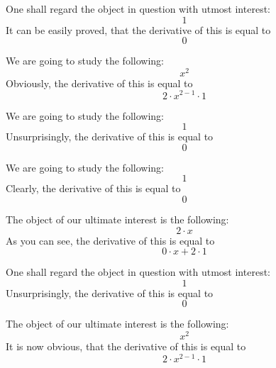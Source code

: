 \documentclass{article}
\begin{document}
One shall regard the object in question with utmost interest:
\begin{equation}
1 
\end{equation}
It can be easily proved, that the derivative of this is equal to
\begin{equation}
0 
\end{equation}

We are going to study the following:
\begin{equation}
x ^{2 } 
\end{equation}
Obviously, the derivative of this is equal to
\begin{equation}
2 \cdot x ^{2 - 1 } \cdot 1 
\end{equation}

We are going to study the following:
\begin{equation}
1 
\end{equation}
Unsurprisingly, the derivative of this is equal to
\begin{equation}
0 
\end{equation}

We are going to study the following:
\begin{equation}
1 
\end{equation}
Clearly, the derivative of this is equal to
\begin{equation}
0 
\end{equation}

The object of our ultimate interest is the following:
\begin{equation}
2 \cdot x 
\end{equation}
As you can see, the derivative of this is equal to
\begin{equation}
0 \cdot x + 2 \cdot 1 
\end{equation}

One shall regard the object in question with utmost interest:
\begin{equation}
1 
\end{equation}
Unsurprisingly, the derivative of this is equal to
\begin{equation}
0 
\end{equation}

The object of our ultimate interest is the following:
\begin{equation}
x ^{2 } 
\end{equation}
It is now obvious, that the derivative of this is equal to
\begin{equation}
2 \cdot x ^{2 - 1 } \cdot 1 
\end{equation}
\end{document}
